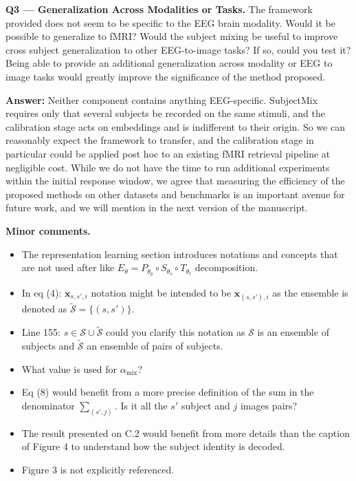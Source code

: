 \documentclass[11pt]{article}
\newcommand{\answer}[1]{{\textbf{Answer:} \color{blue} #1}}
\begin{document}
\textbf{Q3 --- Generalization Across Modalities or Tasks.} The framework provided does not seem to be
specific to the EEG brain modality. Would it be possible to generalize to fMRI? Would the subject
mixing be useful to improve cross subject generalization to other EEG-to-image tasks? If so, could you
test it? Being able to provide an additional generalization across modality or EEG to image tasks would
greatly improve the significance of the method proposed.

\answer{
Neither component contains anything EEG-specific. SubjectMix requires only that several subjects be recorded on the same stimuli, and the calibration stage acts on embeddings and is indifferent to their origin. So we can reasonably expect the framework to transfer, and the calibration stage in particular could be applied post hoc to an existing fMRI retrieval pipeline at negligible cost. While we do not have the time to run additional experiments within the initial response window, we agree that measuring the efficiency of the proposed methods on other datasets and benchmarks is an important avenue for future work, and we will mention in the next version of the manuscript.
}


\textbf{Minor comments.}
\begin{itemize}
\item The representation learning section introduces notations and concepts that are not used after
like $E_\theta = P_{\theta_p} \circ S_{\theta_s} \circ T_{\theta_t}$ decomposition.
\item In eq (4): $\mathbf{x}_{s,s',i}$ notation might be intended to be $\mathbf{x}_{(s,s'),i}$ as the
ensemble is denoted as $\widetilde{\mathcal{S}} = \{(s,s')\}$.
\item Line 155: $s \in \mathcal{S} \cup \widetilde{\mathcal{S}}$ could you clarify this notation as
$\mathcal{S}$ is an ensemble of subjects and $\widetilde{\mathcal{S}}$ an ensemble of pairs of subjects.
\item What value is used for $\alpha_{\mathrm{mix}}$?
\item Eq (8) would benefit from a more precise definition of the sum in the denominator
$\sum_{(s',j)}$. Is it all the $s'$ subject and $j$ images pairs?
\item The result presented on C.2 would benefit from more details than the caption of Figure 4 to
understand how the subject identity is decoded.
\item Figure 3 is not explicitly referenced.
\end{itemize}
\end{document}
